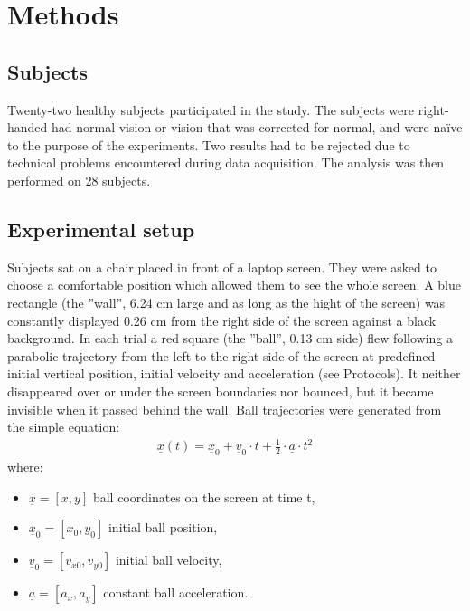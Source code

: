 \section{Methods} \label{Methods}

\subsection{Subjects}

Twenty-two healthy subjects 
participated in the study. The subjects were right-handed
had normal vision or vision that was corrected for normal, and were
na\"ive to the purpose of the experiments. Two results had to be rejected due to technical problems encountered during data acquisition. The analysis was then performed on 28 subjects.


\subsection{Experimental setup}

Subjects sat on a chair placed in front of a laptop screen. They were asked to 
choose a comfortable position which allowed them to see the whole screen. A blue rectangle
(the ''wall'', 6.24 cm large and as long as the hight of the screen) was constantly displayed 
0.26 cm from the right side of the screen against a black background. In each trial a red square (the ''ball'', 
0.13 cm side) flew following a parabolic trajectory from the left to the right side of the screen at predefined initial 
vertical position, initial velocity and acceleration (see Protocols). It neither disappeared over or under the screen boundaries nor bounced, but it became invisible when it passed behind the wall. Ball trajectories were generated from the simple equation:
\begin{eqnarray} \label{Eq:Trajectories}
\underline{x}(t) = \underline{x}_0 + \underline{v}_0 \cdot t +  \frac{1}{2} \cdot \underline{a} \cdot t^2
\end{eqnarray}
where:
\begin{itemize}
	\item $\underline{x} = \left[x, y\right]$ ball coordinates on the screen at time t,
	\item $\underline{x}_0 = \left[x_0, y_0\right]$ initial ball position,
	\item $\underline{v}_0 = \left[v_{x0}, v_{y0}\right]$ initial ball velocity,
	\item  $\underline{a} = \left[a_x, a_y\right]$ constant ball acceleration.
\end{itemize}

